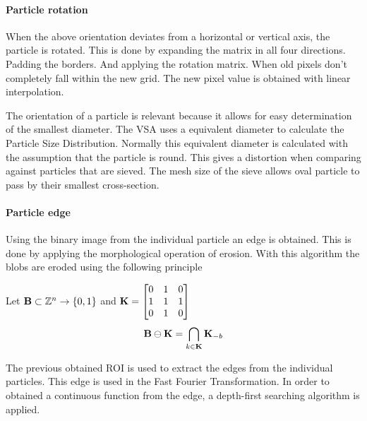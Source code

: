 \documentclass[11pt,fleqn,,a4paper,twoside,openright]{book}
\begin{document}
\paragraph{Particle rotation}\label{Particle rotation}
When the above orientation deviates from a horizontal or vertical axis, the particle is rotated. This is done by expanding the matrix in all four directions. Padding the borders. And applying the rotation matrix. When old pixels don't completely fall within the new grid. The new pixel value is obtained with linear interpolation.

\begin{remark}
	The orientation of a particle is relevant because it allows for easy determination of the smallest diameter. The VSA uses a equivalent diameter to calculate the Particle Size Distribution. Normally this equivalent diameter is calculated with the assumption that the particle is round. This gives a distortion when comparing against particles that are sieved. The mesh size of the sieve allows oval particle to pass by their smallest cross-section.
\end{remark}

\paragraph{Particle edge}
Using the binary image from the individual particle an edge is obtained. This is done by applying the morphological operation of erosion. With this algorithm the blobs are eroded using the following principle
\begin{sBox}
	Let $\mat{B} \subset \mathbb{Z}^n \rightarrow \{0, 1\}$ and $ \mat{K} = \begin{bmatrix}
	0 & 1 & 0 \\
	1 & 1 & 1 \\
	0 & 1 & 0 \\
	\end{bmatrix} $
	\begin{equation}
	\mat{B}  \ominus \mat{K} = \bigcap_{k\in \mat{K}} \mat{K}_{-b}
	\end{equation}
\end{sBox}

The previous obtained ROI is used to extract the edges from the individual particles. This edge is used in the Fast Fourier Transformation. In order to obtained a continuous function from the edge, a depth-first searching algorithm is applied.
\end{document}
